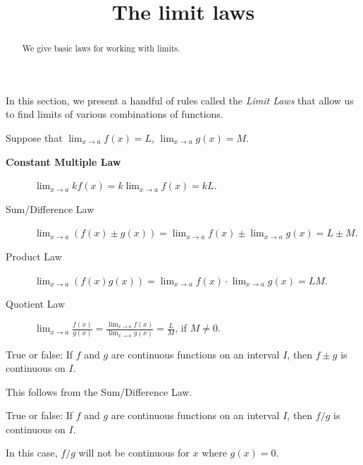 \documentclass{ximera}
\title[Dig-In:]{The limit laws}
\begin{document}
\begin{abstract}
We give basic laws for working with limits. 
\end{abstract}
\maketitle

In this section, we present a handful of rules called the \textit{Limit Laws}
that allow us to find limits of various combinations of functions.

\begin{theorem}\label{theorem:limit-laws}
Suppose that $\displaystyle\lim_{x\to a}f(x)=L$, $\displaystyle\lim_{x\to a}g(x)=M$.
\begin{description}
\item[\textbf{Constant Multiple Law}] $\displaystyle\lim_{x\to a} kf(x) = k\displaystyle\lim_{x\to a}f(x)=kL$.
\item[Sum/Difference Law] $\displaystyle\lim_{x\to a} (f(x) \pm g(x)) =
  \lim_{x\to a}f(x) \pm \lim_{x\to a}g(x)=L \pm M$.
\item[Product Law]  $\displaystyle\lim_{x\to a} (f(x)g(x)) = \displaystyle\lim_{x\to
  a}f(x)\cdot\lim_{x\to a}g(x)=LM$.
\item[Quotient Law]  $\displaystyle\lim_{x\to a} \frac{f(x)}{g(x)} =
  \displaystyle\frac{\lim_{x\to a}f(x)}{\lim_{x\to a}g(x)}=\frac{L}{M}$, if
  $M\ne0$.
\end{description}
\label{thm:limit laws}
\end{theorem}

\begin{question}
  True or false: If $f$ and $g$ are continuous functions on an
  interval $I$, then $f\pm g$ is continuous on $I$.
  \begin{multipleChoice}
  \end{multipleChoice}
  \begin{feedback}
    This follows from the Sum/Difference Law.
  \end{feedback}
\end{question}

\begin{question}
  True or false: If $f$ and $g$ are continuous functions on an
  interval $I$, then $f/g$ is continuous on $I$.
  \begin{multipleChoice}
  \end{multipleChoice}
  \begin{feedback}
    In this case, $f/g$ will not be continuous for $x$ where $g(x) =
    0$.
  \end{feedback}
\end{question}
\end{document}
